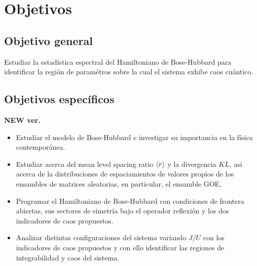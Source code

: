 \documentclass[spanish,titlepage,table]{practicas}
\begin{document}

\section{Objetivos}\label{sec:objetivos}
\subsection{Objetivo general}
  Estudiar la estadística espectral del Hamiltoniano de Bose-Hubbard para identificar la región de paramétros sobre la cual 
 el sistema exhibe caos cuántico.
 \subsection{Objetivos específicos}
 \textbf{NEW ver.}
  \begin{itemize}
    \item Estudiar el modelo de Bose-Hubbard e investigar su importancia en la física contemporánea.
    \item Estudiar acerca del mean level spacing ratio $\ev{r}$ y la divergencia $KL$, asi acerca de la distribuciones de  espaciamientos de valores propios de los ensambles de matrices aleatorias, en particular, el ensamble GOE.
    \item Programar el Hamiltoniano de Bose-Hubbard con condiciones de frontera abiertas, sus sectores de simetría bajo el operador reflexión y los dos indicadores de caos propuestos.
    \item Analizar distintas configuraciones del sistema variando $J/U$ con los indicadores de caos propuestos y con ello identificar las regiones de integrabilidad y caos del sistema.
 \end{itemize}
 
\end{document}
